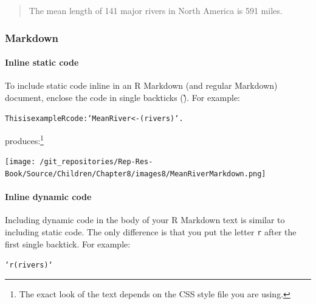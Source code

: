 \begin{quote}
    The mean length of 141 major rivers in North America is 591 miles. 
\end{quote}

\subsubsection{Markdown}

\paragraph{Inline static code}

To include static code inline in an R Markdown (and regular Markdown) document, enclose the code in single backticks (\` \`). For example:

\begin{knitrout}
\color{fgcolor}\begin{kframe}
\begin{alltt}
This is example R code: `MeanRiver <- (rivers)`.
\end{alltt}
\end{kframe}
\end{knitrout}


\noindent produces:\footnote{The exact look of the text depends on the CSS style file you are using.}

\texttt{[image: /git\_repositories/Rep-Res-Book/Source/Children/Chapter8/images8/MeanRiverMarkdown.png]}

\paragraph{Inline dynamic code}

Including dynamic code in the body of your R Markdown text is similar to including static code. The only difference is that you put the letter \texttt{r} after the first single backtick. For example:

\begin{knitrout}
\color{fgcolor}\begin{kframe}
\begin{alltt}
`r (rivers)`
\end{alltt}
\end{kframe}
\end{knitrout}


